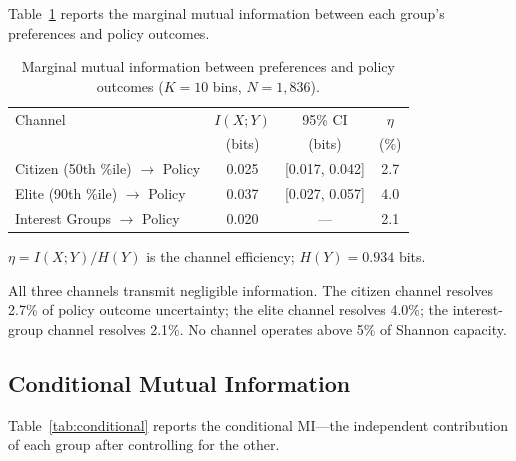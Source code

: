 \documentclass[twocolumn,10pt]{article}
\begin{document}
Table~\ref{tab:marginal} reports the marginal mutual information between each group's preferences and policy outcomes.

\begin{table}[t]
\centering
\caption{Marginal mutual information between preferences and policy outcomes ($K=10$ bins, $N=1{,}836$).}
\label{tab:marginal}
\begin{tabular}{@{}lccc@{}}
\toprule
Channel & $I(X;Y)$ & 95\% CI & $\eta$ \\
 & (bits) & (bits) & (\%) \\
\midrule
Citizen (50th \%ile) $\to$ Policy & 0.025 & [0.017, 0.042] & 2.7 \\
Elite (90th \%ile) $\to$ Policy & 0.037 & [0.027, 0.057] & 4.0 \\
Interest Groups $\to$ Policy & 0.020 & --- & 2.1 \\
\bottomrule
\end{tabular}
\smallskip

\footnotesize{$\eta = I(X;Y)/H(Y)$ is the channel efficiency; $H(Y) = 0.934$ bits.}
\end{table}

All three channels transmit negligible information.  The citizen channel resolves 2.7\% of policy outcome uncertainty; the elite channel resolves 4.0\%; the interest-group channel resolves 2.1\%.  No channel operates above 5\% of Shannon capacity.

\subsection{Conditional Mutual Information}

Table~\ref{tab:conditional} reports the conditional MI---the independent contribution of each group after controlling for the other.
\end{document}

